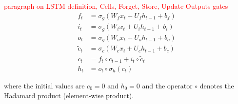 \documentclass[12pt]{report}
\begin{document}




\textcolor{red}{paragraph on LSTM definition, Cells,  Forget, Store, Update Outputs gates}\\




\begin{align*}
	f_t &= \sigma_g(W_{f} x_t + U_{f} h_{t-1} + b_f) \\
	i_t &= \sigma_g(W_{i} x_t + U_{i} h_{t-1} + b_i) \\
	o_t &= \sigma_g(W_{o} x_t + U_{o} h_{t-1} + b_o) \\
	\tilde{c}_t &= \sigma_c(W_{c} x_t + U_{c} h_{t-1} + b_c) \\
	c_t &= f_t \circ c_{t-1} + i_t \circ \tilde{c}_t \\
	h_t &= o_t \circ \sigma_h(c_t)
\end{align*}

where the initial values are $c_0 = 0$ and $h_0 = 0$ and the operator $\circ$ denotes the Hadamard product (element-wise product). 
\end{document}
